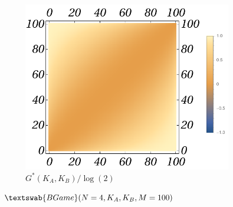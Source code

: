 \documentclass{article}
\theoremstyle{definition}
\newcommand{\BG}[1]{$\textswab{BGame}(#1)$}
\begin{document}
\begin{figure}[H]
\begin{subfigure}[b]{0.3\textwidth}
    \end{subfigure}
    \hfill %
    \begin{subfigure}[b]{0.3\textwidth}
        \includegraphics[width=\textwidth]{img/GB_Plot_4_100.pdf}
        \caption{$G^*(K_A,K_B)/\log(2)$}
        \label{fig:BGame4__100_G}
    \end{subfigure}
    
    \caption{\BG{N=4,K_A,K_B,M=100}}
    \label{fig:BGame4__100_PppkG}
\end{figure}
\end{document}
